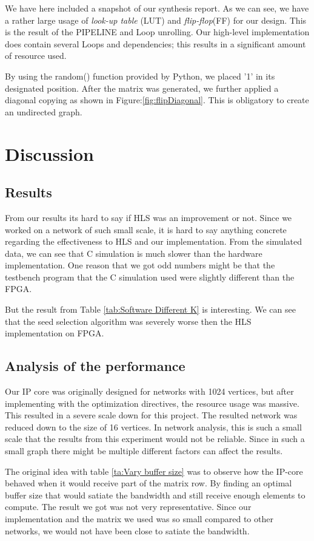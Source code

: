 We have here included a snapshot of our synthesis report. As we can see, we have a rather large usage of \textit{look-up table} (LUT) and \textit{flip-flop}(FF) for our design. This is the result of the PIPELINE and Loop unrolling. Our high-level implementation does contain several Loops and dependencies; this results in a significant amount of resource used. 


By using the random() function provided by Python, we placed '1' in its designated position. After the matrix was generated, we further applied a diagonal copying as shown in Figure:\ref{fig:flipDiagonal}. This is obligatory to create an undirected graph.



\section{Discussion}

\subsection{Results}
From our results its hard to say if HLS was an improvement or not. Since we worked on a network of such small scale, it is hard to say anything concrete regarding the effectiveness to HLS and our implementation. From the simulated data, we can see that C simulation is much slower than the hardware implementation. One reason that we got odd numbers might be that the testbench program that the C simulation used were slightly different than the FPGA.  

But the result from Table \ref{tab:Software Different K} is interesting. We can see that the seed selection algorithm was severely worse then the HLS implementation on FPGA. 

\subsection*{Analysis of the performance}
Our IP core was originally designed for networks with 1024 vertices, but after implementing with the optimization directives, the resource usage was massive. This resulted in a severe scale down for this project. The resulted network was reduced down to the size of 16 vertices. In network analysis, this is such a small scale that the results from this experiment would not be reliable. Since in such a small graph there might be multiple different factors can affect the results.  

The original idea with table \ref{ta:Vary buffer size} was to observe how the IP-core behaved when it would receive part of the matrix row. By finding an optimal buffer size that would satiate the bandwidth and still receive enough elements to compute. The result we got was not very representative. Since our implementation and the matrix we used was so small compared to other networks, we would not have been close to satiate the bandwidth.
 

